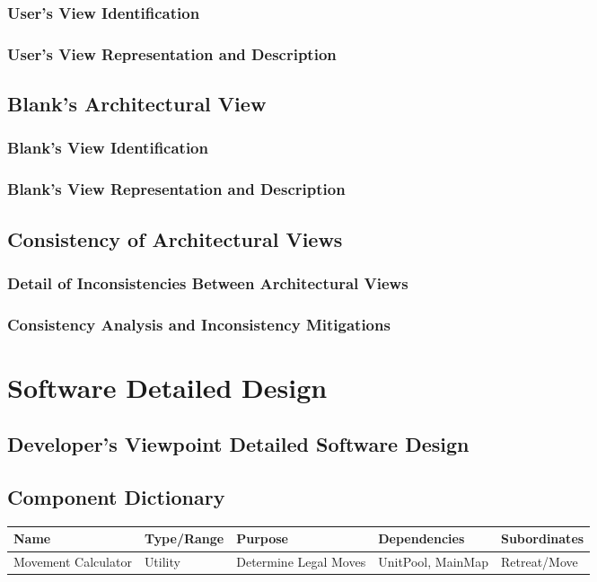 \documentclass[12pt,a4paper]{article}
\begin{document}
		\subsubsection{User's View Identification}
		\subsubsection{User's View Representation and Description}
	\subsection{Blank's Architectural View}
		\subsubsection{Blank's View Identification}
		\subsubsection{Blank's View Representation and Description}
	\subsection{Consistency of Architectural Views}
		\subsubsection{Detail of Inconsistencies Between Architectural Views}
		\subsubsection{Consistency Analysis and Inconsistency Mitigations}
\section{Software Detailed Design}
	\subsection{Developer's Viewpoint Detailed Software Design}
	\subsection{Component Dictionary}

\small{
\begin{center}
\noindent\begin{tabularx}{\linewidth}{|X|X|X|X|X|}\hline
\textbf{Name} & \textbf{Type/Range} & \textbf{Purpose} & \textbf{Dependencies} & \textbf{Subordinates}\\
\hline
Movement Calculator & Utility & Determine Legal Moves & UnitPool, MainMap & Retreat/Move\\
\hline
\end{tabularx}
\end{center}
}
\end{document}
